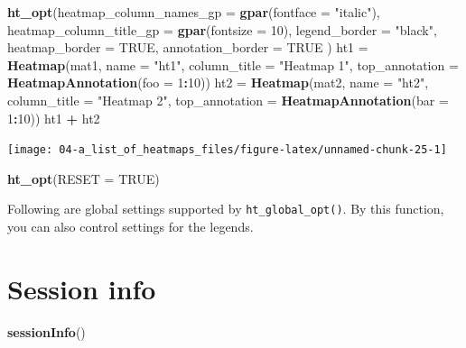 \documentclass[]{book}
\newenvironment{Shaded}{\begin{snugshade}}{\end{snugshade}}
\newcommand{\KeywordTok}[1]{\textcolor[rgb]{0.13,0.29,0.53}{\textbf{#1}}}
\newcommand{\DataTypeTok}[1]{\textcolor[rgb]{0.13,0.29,0.53}{#1}}
\newcommand{\DecValTok}[1]{\textcolor[rgb]{0.00,0.00,0.81}{#1}}
\newcommand{\StringTok}[1]{\textcolor[rgb]{0.31,0.60,0.02}{#1}}
\newcommand{\OtherTok}[1]{\textcolor[rgb]{0.56,0.35,0.01}{#1}}
\newcommand{\OperatorTok}[1]{\textcolor[rgb]{0.81,0.36,0.00}{\textbf{#1}}}
\newcommand{\NormalTok}[1]{#1}
\theoremstyle{definition}
\theoremstyle{definition}
\theoremstyle{definition}
\theoremstyle{remark}
\begin{document}
\begin{Shaded}
\begin{Highlighting}[]
\KeywordTok{ht_opt}\NormalTok{(}\DataTypeTok{heatmap_column_names_gp =} \KeywordTok{gpar}\NormalTok{(}\DataTypeTok{fontface =} \StringTok{"italic"}\NormalTok{), }
    \DataTypeTok{heatmap_column_title_gp =} \KeywordTok{gpar}\NormalTok{(}\DataTypeTok{fontsize =} \DecValTok{10}\NormalTok{),}
    \DataTypeTok{legend_border =} \StringTok{"black"}\NormalTok{,}
    \DataTypeTok{heatmap_border =} \OtherTok{TRUE}\NormalTok{,}
    \DataTypeTok{annotation_border =} \OtherTok{TRUE}
\NormalTok{)}
\NormalTok{ht1 =}\StringTok{ }\KeywordTok{Heatmap}\NormalTok{(mat1, }\DataTypeTok{name =} \StringTok{"ht1"}\NormalTok{, }\DataTypeTok{column_title =} \StringTok{"Heatmap 1"}\NormalTok{,}
    \DataTypeTok{top_annotation =} \KeywordTok{HeatmapAnnotation}\NormalTok{(}\DataTypeTok{foo =} \DecValTok{1}\OperatorTok{:}\DecValTok{10}\NormalTok{))}
\NormalTok{ht2 =}\StringTok{ }\KeywordTok{Heatmap}\NormalTok{(mat2, }\DataTypeTok{name =} \StringTok{"ht2"}\NormalTok{, }\DataTypeTok{column_title =} \StringTok{"Heatmap 2"}\NormalTok{,}
    \DataTypeTok{top_annotation =} \KeywordTok{HeatmapAnnotation}\NormalTok{(}\DataTypeTok{bar =} \DecValTok{1}\OperatorTok{:}\DecValTok{10}\NormalTok{))}
\NormalTok{ht1 }\OperatorTok{+}\StringTok{ }\NormalTok{ht2}
\end{Highlighting}
\end{Shaded}

\begin{center}\texttt{[image: 04-a\_list\_of\_heatmaps\_files/figure-latex/unnamed-chunk-25-1]} \end{center}

\begin{Shaded}
\begin{Highlighting}[]
\KeywordTok{ht_opt}\NormalTok{(}\DataTypeTok{RESET =} \OtherTok{TRUE}\NormalTok{)}
\end{Highlighting}
\end{Shaded}

Following are global settings supported by \texttt{ht\_global\_opt()}.
By this function, you can also control settings for the legends.

\section{Session info}\label{session-info}

\begin{Shaded}
\begin{Highlighting}[]
\KeywordTok{sessionInfo}\NormalTok{()}
\end{Highlighting}
\end{Shaded}
\end{document}
